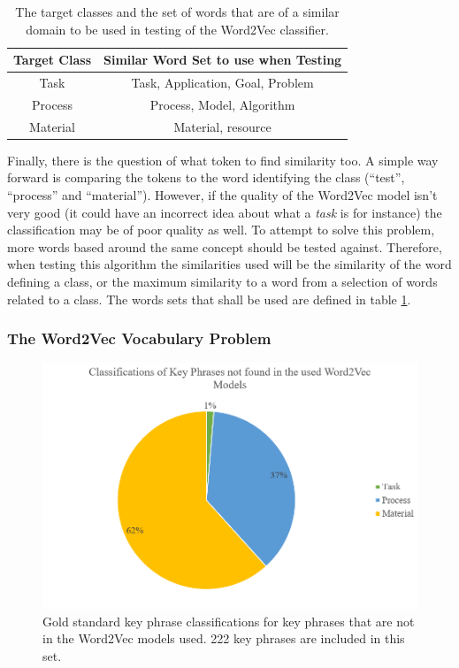 \begin{table}
	\centering
	\caption[Word2Vec Classification Target Words]{The target classes and the set of words that are of a similar domain to be used in testing of the Word2Vec classifier.}
	\begin{tabular}{ c | c }
		\textbf{Target Class} & \textbf{Similar Word Set to use when Testing} \\
		\hline
		Task & Task, Application, Goal, Problem \\
		 \hline
		Process & Process, Model, Algorithm\\
		 \hline
		Material & Material, resource \\
	\end{tabular}
	\label{table:w2vclasswords}
\end{table}

Finally, there is the question of what token to find similarity too. A simple way forward is comparing the tokens to the word identifying the class (``test'', ``process'' and ``material''). However, if the quality of the Word2Vec model isn't very good (it could have an incorrect idea about what a \textit{task} is for instance) the classification may be of poor quality as well. To attempt to solve this problem, more words based around the same concept should be tested against. Therefore, when testing this algorithm the similarities used will be the similarity of the word defining a class, or the maximum similarity to a word from a selection of words related to a class. The words sets that shall be used are defined in table \ref{table:w2vclasswords}.

\subsubsection*{The Word2Vec Vocabulary Problem}

\begin{figure}
	\centering
	\includegraphics[width=12cm]{img/w2vbadtokensclasses.png}
	\caption[Key Phrase Classifications not in Word2Vec Model]{Gold standard key phrase classifications for key phrases that are not in the Word2Vec models used. 222 key phrases are included in this set.}
	\label{figure:w2vbadtokensclasses}
\end{figure}

